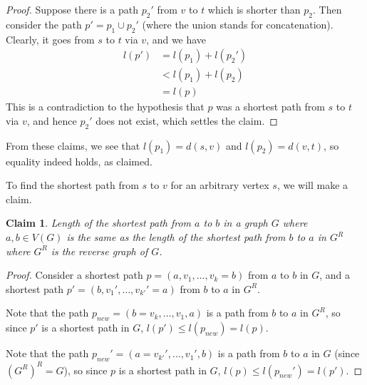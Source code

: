 \documentclass[answers]{exam}
\newtheorem{claim}{Claim}
\begin{document}
\begin{questions}
\begin{solution}
\begin{proof}
Suppose there is a path $p_2'$ from $v$ to $t$ which is shorter than $p_2$. Then consider the path $p' = p_1 \cup p_2'$ (where the union stands for concatenation). Clearly, it goes from $s$ to $t$ via $v$, and we have 
\begin{align*}
    l(p') &= l(p_1) + l(p_2')\\
          &< l(p_1) + l(p_2)\\
          &= l(p)
\end{align*}
This is a contradiction to the hypothesis that $p$ was a shortest path from $s$ to $t$ via $v$, and hence $p_2'$ does not exist, which settles the claim.
\end{proof}

From these claims, we see that $l(p_1) = d(s, v)$ and $l(p_2) = d(v, t)$, so equality indeed holds, as claimed.


To find the shortest path from $s$ to $v$ for an arbitrary vertex $s$, we will make a claim.

\begin{claim}
Length of the shortest path from $a$ to $b$ in a graph $G$ where $a,b \in V(G)$ is the same as the length of the shortest path from $b$ to $a$ in $G^{R}$ where $G^{R}$ is the reverse graph of $G$.
\end{claim}

\begin{proof}

Consider a shortest path $p = \left(a, v_1, \dots, v_k = b\right)$ from $a$ to $b$ in $G$, and a shortest path $p' = \left(b, v_1', \dots, v_{k'}' = a\right)$ from $b$ to $a$ in $G^{R}$.

Note that the path $p_{new} = \left(b = v_k, \dots, v_1, a\right)$ is a path from $b$ to $a$ in $G^R$, so since $p'$ is a shortest path in $G$, $l(p') \le l(p_{new}) = l(p)$.

Note that the path $p_{new}' = \left(a = v_{k'}', \dots, v_1', b\right)$ is a path from $b$ to $a$ in $G$ (since $\left(G^R\right)^R = G$), so since $p$ is a shortest path in $G$, $l(p) \le l(p_{new}') = l(p')$.


\end{proof}
\end{solution}
\end{questions}
\end{document}

